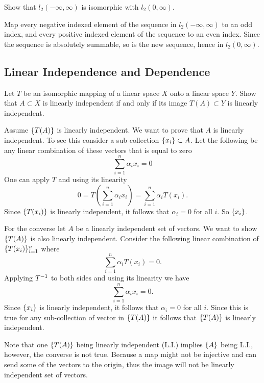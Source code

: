 \begin{problem}
	Show that $ l_2(-\infty,\infty) $ is isomorphic with $ l_2(0,\infty) $.
\end{problem}
\begin{solution}
	Map every negative indexed element of the sequence in $ l_2(-\infty,\infty) $ to an odd index, and every positive indexed element of the sequence to an even index. Since the sequence is absolutely summable, so is the new sequence, hence in $ l_2(0,\infty) $.
\end{solution}


\subsection{Linear Independence and Dependence}
\begin{problem}
	Let $ T $ be an isomorphic mapping of a linear space $ X $ onto a linear space $ Y $. Show that $ A\subset X $ is linearly independent if and only if its image $ T(A)\subset Y $ is linearly independent.
\end{problem}
\begin{solution}
	Assume $ \{T(A)\} $ is linearly independent. We want to prove that $ A $ is linearly independent. To see this consider a sub-collection $ \{x_i\} \subset A $. Let the following be any linear combination of these vectors that is equal to zero
	\[ \sum_{i=1}^{n}\alpha_i x_i = 0 \]
	One can apply $ T $ and using its linearity
	\[ 0 = T(\sum_{i=1}^{n}\alpha_i x_i) = \sum_{i=1}^{n}\alpha_i T(x_i).  \]
	Since $ \{T(x_i)\} $ is linearly independent, it follows that $ \alpha_i = 0 $ for all $ i $. So $ \{x_i\} $.
	
	For the converse let $ A $ be a linearly independent set of vectors. We want to show $ \{T(A)\} $ is also linearly independent. Consider the following linear combination of $ \{T(x_i)\}_{i=1}^n $ where
	\[ \sum_{i=1}^{n}\alpha_i T(x_i) =0. \]
	Applying $ T^{-1} $ to both sides and using its linearity we have
	\[ \sum_{i=1}^n \alpha_i x_i = 0. \]
	Since $ \{x_i\} $ is linearly independent, it follows that $ \alpha_i = 0 $ for all $ i $. Since this is true for any sub-collection of vector in $ \{T(A)\} $ it follows that $ \{T(A)\} $ is linearly independent.
\end{solution}

\begin{remark}
	Note that one $ \{T(A)\} $ being linearly independent (L.I.) implies $ \{A\} $ being L.I., however, the converse is not true. Because a map might not be injective and can send some of the vectors to the origin, thus the image will not be linearly independent set of vectors. 
\end{remark}

